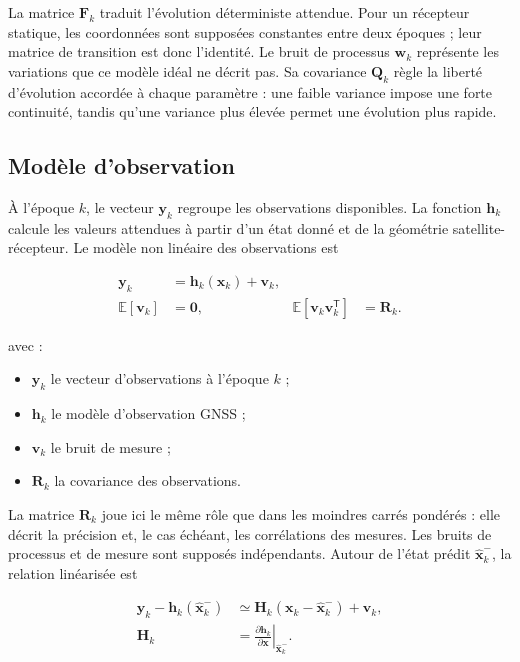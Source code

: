 La matrice $\mathbf F_k$ traduit l'évolution déterministe attendue. Pour un
récepteur statique, les coordonnées sont supposées constantes entre deux
époques ; leur matrice de transition est donc l'identité. Le bruit de processus
$\mathbf w_k$ représente les variations que ce modèle idéal ne décrit pas. Sa
covariance $\mathbf Q_k$ règle la liberté d'évolution accordée à chaque
paramètre : une faible variance impose une forte continuité, tandis qu'une
variance plus élevée permet une évolution plus rapide.

\subsection{Modèle d'observation}

À l'époque $k$, le vecteur $\mathbf y_k$ regroupe les observations disponibles.
La fonction $\mathbf h_k$ calcule les valeurs attendues à partir d'un état
donné et de la géométrie satellite-récepteur. Le modèle non linéaire des
observations est

\begin{align}
\mathbf y_k
&=
\mathbf h_k(\mathbf x_k)+\mathbf v_k,
\\
\mathbb E[\mathbf v_k]
&=\mathbf0,
&
\mathbb E[\mathbf v_k\mathbf v_k^{\mathsf T}]
&=\mathbf R_k.
\label{eq:kalman_observation}
\end{align}

avec :

\begin{itemize}
    \item $\mathbf y_k$ le vecteur d'observations à l'époque $k$ ;
    \item $\mathbf h_k$ le modèle d'observation GNSS ;
    \item $\mathbf v_k$ le bruit de mesure ;
    \item $\mathbf R_k$ la covariance des observations.
\end{itemize}

La matrice $\mathbf R_k$ joue ici le même rôle que dans les moindres carrés
pondérés : elle décrit la précision et, le cas échéant, les corrélations des
mesures. Les bruits de processus et de mesure sont supposés indépendants.
Autour de l'état prédit $\widehat{\mathbf x}_k^-$, la relation linéarisée est

\begin{align}
\mathbf y_k-\mathbf h_k(\widehat{\mathbf x}_k^-)
&\simeq
\mathbf H_k
\left(\mathbf x_k-\widehat{\mathbf x}_k^-\right)
+\mathbf v_k,
\\
\mathbf H_k
&=
\left.
\frac{\partial\mathbf h_k}{\partial\mathbf x}
\right|_{\widehat{\mathbf x}_k^-}.
\label{eq:ekf_linearization}
\end{align}

